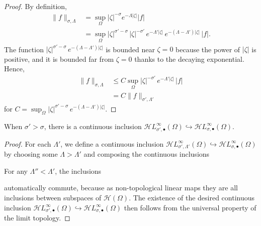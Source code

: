 \documentclass[final]{siamart220329}
\newcommand{\holo}{\mathcal{H}}
\newcommand{\singexp}[2]{\mathcal{H}L^\infty_{#1, #2}}
\newcommand{\singexpalg}[1]{\singexp{#1}{\bullet}}
\newcommand{\domain}{\Omega}
\begin{document}
\begin{proof}
By definition,
\begin{align*}
\|f\|_{\sigma,\Lambda}&=\sup_{\Omega} |\zeta|^{-\sigma}  e^{-\Lambda |\zeta|} |f|\\
&= \sup_{\Omega} |\zeta|^{\sigma'-\sigma}\,|\zeta|^{-\sigma'}\,e^{-\Lambda'|\zeta|}\,  e^{-(\Lambda-\Lambda') |\zeta|} \, |f|.
\end{align*}
The function $|\zeta|^{\sigma'-\sigma}\,  e^{-(\Lambda-\Lambda') |\zeta|}$ is bounded near $\zeta = 0$ because the power of $|\zeta|$ is positive, and it is bounded far from $\zeta = 0$ thanks to the decaying exponential. Hence,
\begin{align*}
\|f\|_{\sigma,\Lambda}&\leq C\sup_\Omega  |\zeta|^{-\sigma'}\, e^{-\Lambda'|\zeta|} \, |f|\\
&=C \|f\|_{\sigma',\Lambda'}
\end{align*}
for $C = \sup_{\Omega}  |\zeta|^{\sigma'-\sigma}\,  e^{-(\Lambda-\Lambda') |\zeta|}$.
\end{proof}
\begin{proposition}\label{prop:inclus-lt-pow-alg}
When $\sigma' > \sigma$, there is a continuous inclusion $\singexpalg{\sigma'}(\domain)\hookrightarrow \singexpalg{\sigma}(\domain)$.
\end{proposition}
\begin{proof}
For each $\Lambda'$, we define a continuous inclusion $\singexp{\sigma'}{\Lambda'}(\domain) \hookrightarrow \singexpalg{\sigma}(\domain)$ by choosing some $\Lambda > \Lambda'$ and composing the continuous inclusions
\begin{center}
\end{center}
For any $\Lambda'' < \Lambda'$, the inclusions
\begin{center}
\end{center}
automatically commute, because as non-topological linear maps they are all inclusions between subspaces of $\holo(\domain)$. The existence of the desired continuous inclusion $\singexpalg{\sigma'}(\Omega)\hookrightarrow \singexpalg{\sigma}(\Omega)$ then follows from the universal property of the limit topology.
\end{proof}
\end{document}
